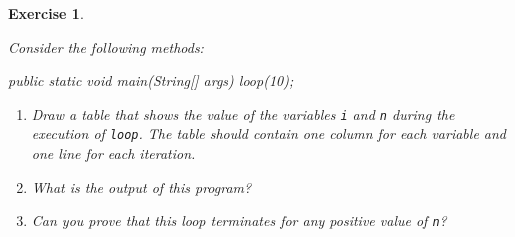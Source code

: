 \documentclass[12pt]{book}
\theoremstyle{exercise}
\newtheorem{exercise}{Exercise}[chapter]
\newcommand{\java}[1]{\verb"#1"}
\begin{document}


\begin{exercise}
\label{infloop}

Consider the following methods:

\begin{code}
    public static void main(String[] args) {
        loop(10);
    }
\end{code}


\begin{enumerate}

\item Draw a table that shows the value of the variables \java{i} and \java{n} during the execution of \java{loop}.
The table should contain one column for each variable and one line for each iteration.

\item What is the output of this program?

\item Can you prove that this loop terminates for any positive value of \java{n}?



\end{enumerate}

\end{exercise}
\end{document}
